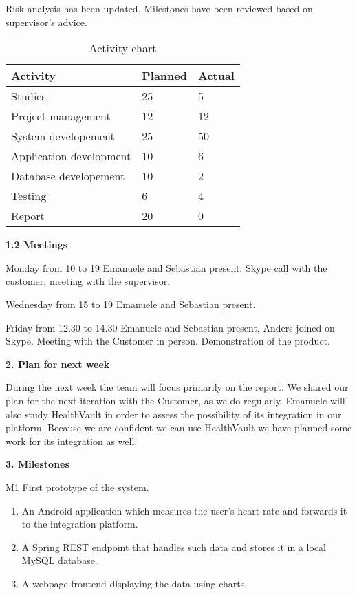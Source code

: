 Risk analysis has been updated. Milestones have been reviewed based on supervisor’s advice.

\begin{table}[H]
\begin{center}
\begin{tabular}{ l | l | l }
  \hline
  Activity & Planned & Actual \\
  \hline\noalign{\smallskip}\noalign{\smallskip}\hline
  Studies & 25 & 5 \\
  Project management & 12 & 12 \\
  System developement & 25 & 50 \\
  Application development & 10 & 6 \\
  Database developement & 10 & 2 \\
  Testing & 6 & 4 \\
  Report & 20 & 0 \\
  \hline
\end{tabular}
\end{center}
\caption{Activity chart}
\label{table:activityChartStatusReportWeek38}
\end{table}

\textbf{1.2 Meetings}

Monday from 10 to 19
Emanuele and Sebastian present.
Skype call with the customer, meeting with the supervisor.

Wednesday from 15 to 19
Emanuele and Sebastian present.

Friday from 12.30 to 14.30
Emanuele and Sebastian present, Anders joined on Skype.
Meeting with the Customer in person. Demonstration of the product.

\textbf{2. Plan for next week}

During the next week the team will focus primarily on the report.
We shared our plan for the next iteration with the Customer, as we do regularly. 
Emanuele will also study HealthVault in order to assess the possibility of its integration in our platform. 
Because we are confident we can use HealthVault  we have planned some work for its integration as well.

\textbf{3. Milestones}

M1 First prototype of the system.

\begin{enumerate}
\item An Android application which measures the user’s heart rate and forwards it to the integration platform.
\item A Spring REST endpoint that handles such data and stores it in a local MySQL database.
\item A webpage frontend displaying the data using charts.
\end{enumerate}

